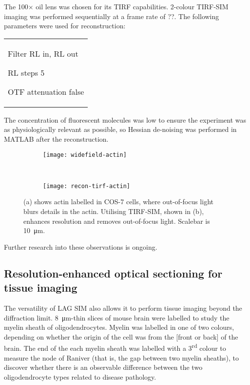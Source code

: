 The 100$\times$ oil lens was chosen for its TIRF capabilities. 
2-colour TIRF-SIM imaging was performed sequentially at a frame rate of ??. 
The following parameters were used for reconstruction: \newline
\begin{tabular}{p{}}
\begin{labelling}[margin=OTF attenuation]
	\item[Filter] RL in, RL out
	\item[RL steps] 5
	\item[OTF attenuation] false
\end{labelling}
\end{tabular}

The concentration of fluorescent molecules was low to ensure the experiment was as physiologically relevant as possible, so Hessian de-noising was performed in MATLAB after the reconstruction. 

\begin{figure}[tbp!]
\centering
\begin{subfigure}[b]{0.7\textwidth}
	\texttt{[image: widefield-actin]}
	\caption{}\label{fig:widefield-actin}
\end{subfigure}

~\newline
\begin{subfigure}[b]{0.7\textwidth}
	\texttt{[image: recon-tirf-actin]}
	\caption{}\label{fig:recon-tirf-actin}
\end{subfigure}
\caption[LAG SIM: TIRF imaging of actin in COS-7 cells removes out-of-focus light]{(a) shows actin labelled in COS-7 cells, where out-of-focus light blurs details in the actin. Utilising TIRF-SIM, shown in (b), enhances resolution and removes out-of-focus light. Scalebar is \SI{10}{\micro\metre}. }
\label{fig:recon-actin}
\end{figure}

Further research into these observations is ongoing. 


\subsection{Resolution-enhanced optical sectioning for tissue imaging}
The versatility of LAG SIM also allows it to perform tissue imaging beyond the diffraction limit. 
\SI{8}{\micro\metre}-thin slices of mouse brain were labelled to study the myelin sheath of oligodendrocytes. 
Myelin was labelled in one of two colours, depending on whether the origin of the cell was from the [front or back] of the brain. 
The end of the each myelin sheath was labelled with a 3\textsuperscript{rd} colour to measure the node of Raniver (that is, the gap between two myelin sheaths), to discover whether there is an observable difference between the two oligodendrocyte types related to disease pathology. 

